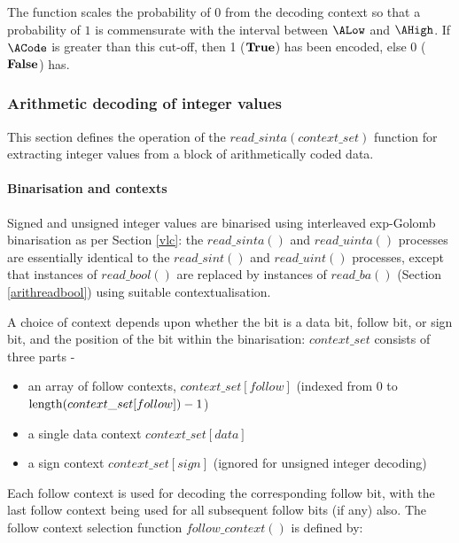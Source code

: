 \begin{informative}
The function scales the probability of $0$ from the decoding context
so that a probability of $1$ is commensurate with the interval between
 $\ALow$ and $\AHigh$. If $\ACode$ is greater than this cut-off, then 1 ($\text{\bf{True}}$) has
been encoded, else 0 ($\text{\bf{False}}$) has.
\end{informative}

\subsubsection{Arithmetic decoding of integer values}

\label{arithreadint}

This section defines the operation of the $read\_sinta(context\_set)$ function
 for extracting integer values from a block of arithmetically coded data.

\paragraph{Binarisation and contexts \\}

Signed and unsigned integer values are binarised using interleaved exp-Golomb
 binarisation as per Section \ref{vlc}: the $read\_sinta()$ and $read\_uinta()$
processes are essentially identical to the 
$read\_sint()$ and $read\_uint()$ processes, except that instances of $read\_bool()$ are replaced
by instances of $read\_ba()$ (Section \ref{arithreadbool}) using suitable contextualisation. 

A choice of context depends upon whether the bit is a data bit, follow bit, or sign bit, and the 
position of the bit within the binarisation: $context\_set$ consists of three parts -
\begin{itemize}
\item an array of follow contexts, $context\_set[follow]$ (indexed from 0 to 
$\operatorname{length}(context\_set[follow])-1$)
\item a single data context $context\_set[data]$ 
\item a sign context $context\_set[sign]$ (ignored for unsigned integer decoding)
\end{itemize}

Each follow context is used for decoding the corresponding follow bit, with the
last follow context being used for all subsequent follow bits (if any) also. 
The follow context selection function $follow\_context()$ is defined by:

